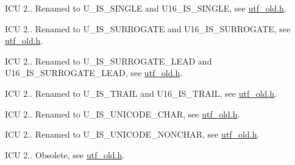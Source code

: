 \begin{DoxyRefList}
I\+CU 2.. Renamed to U\+\_\+\+I\+S\+\_\+\+S\+I\+N\+G\+LE and U16\+\_\+\+I\+S\+\_\+\+S\+I\+N\+G\+LE, see \mbox{\hyperlink{utf__old_8h}{utf\+\_\+old.\+h}}.  
\item[Member \mbox{\hyperlink{utf__old_8h_ab8d1054e7a2b034ae92e824049bece53}{U\+T\+F\+\_\+\+I\+S\+\_\+\+S\+U\+R\+R\+O\+G\+A\+TE}} (uchar)]\label{deprecated__deprecated000095}%
%
I\+CU 2.. Renamed to U\+\_\+\+I\+S\+\_\+\+S\+U\+R\+R\+O\+G\+A\+TE and U16\+\_\+\+I\+S\+\_\+\+S\+U\+R\+R\+O\+G\+A\+TE, see \mbox{\hyperlink{utf__old_8h}{utf\+\_\+old.\+h}}.  
\item[Member \mbox{\hyperlink{utf__old_8h_a01d4e0a9e33635d69fd827b5e42d5dea}{U\+T\+F\+\_\+\+I\+S\+\_\+\+S\+U\+R\+R\+O\+G\+A\+T\+E\+\_\+\+F\+I\+R\+ST}} (c)]\label{deprecated__deprecated000129}%
%
I\+CU 2.. Renamed to U\+\_\+\+I\+S\+\_\+\+S\+U\+R\+R\+O\+G\+A\+T\+E\+\_\+\+L\+E\+AD and U16\+\_\+\+I\+S\+\_\+\+S\+U\+R\+R\+O\+G\+A\+T\+E\+\_\+\+L\+E\+AD, see \mbox{\hyperlink{utf__old_8h}{utf\+\_\+old.\+h}}.  
\item[Member \mbox{\hyperlink{utf__old_8h_aa4dec014f34873a400e8fb617e31e70b}{U\+T\+F\+\_\+\+I\+S\+\_\+\+T\+R\+A\+IL}} (uchar)]\label{deprecated__deprecated000214}%
%
I\+CU 2.. Renamed to U\+\_\+\+I\+S\+\_\+\+T\+R\+A\+IL and U16\+\_\+\+I\+S\+\_\+\+T\+R\+A\+IL, see \mbox{\hyperlink{utf__old_8h}{utf\+\_\+old.\+h}}.  
\item[Member \mbox{\hyperlink{utf__old_8h_a662686c12201d9d592d2908f2b0cf6ed}{U\+T\+F\+\_\+\+I\+S\+\_\+\+U\+N\+I\+C\+O\+D\+E\+\_\+\+C\+H\+AR}} (c)]\label{deprecated__deprecated000097}%
%
I\+CU 2.. Renamed to U\+\_\+\+I\+S\+\_\+\+U\+N\+I\+C\+O\+D\+E\+\_\+\+C\+H\+AR, see \mbox{\hyperlink{utf__old_8h}{utf\+\_\+old.\+h}}.  
\item[Member \mbox{\hyperlink{utf__old_8h_a33f12d9f7b4299c00e4bb1805b9fb962}{U\+T\+F\+\_\+\+I\+S\+\_\+\+U\+N\+I\+C\+O\+D\+E\+\_\+\+N\+O\+N\+C\+H\+AR}} (c)]\label{deprecated__deprecated000096}%
%
I\+CU 2.. Renamed to U\+\_\+\+I\+S\+\_\+\+U\+N\+I\+C\+O\+D\+E\+\_\+\+N\+O\+N\+C\+H\+AR, see \mbox{\hyperlink{utf__old_8h}{utf\+\_\+old.\+h}}.  
\item[Member \mbox{\hyperlink{utf__old_8h_a40d9e02afb708312e02391210127d59b}{U\+T\+F\+\_\+\+I\+S\+\_\+\+V\+A\+L\+ID}} (c)]\label{deprecated__deprecated000094}%
%
I\+CU 2.. Obsolete, see \mbox{\hyperlink{utf__old_8h}{utf\+\_\+old.\+h}}.  

\end{DoxyRefList}
